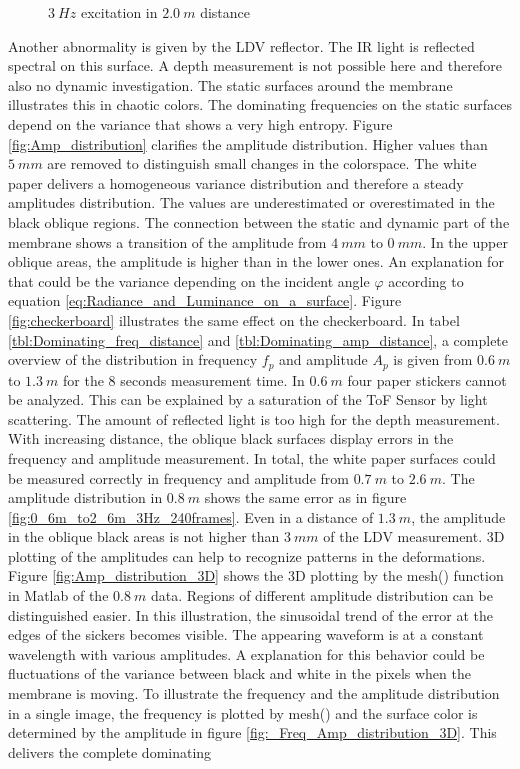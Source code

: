 \begin{figure}[!h]
	\hfill
	\caption{$3~Hz$ excitation in $2.0~m$ distance}
\end{figure}
\newpage
 Another abnormality is given by the LDV reflector. The IR light is reflected spectral on this surface. A depth measurement is not possible here and therefore also no dynamic investigation. The static surfaces around the membrane illustrates this in chaotic colors. The dominating frequencies on the static surfaces depend on the variance that shows a very high entropy. Figure \ref{fig:Amp_distribution} clarifies the amplitude distribution. Higher values than $5~mm$ are removed to distinguish small changes in the colorspace. The white paper delivers a homogeneous variance distribution and therefore a steady amplitudes distribution. The values are underestimated or overestimated in the black oblique regions. The connection between the static and dynamic part of the membrane shows a transition of the amplitude from $4~mm$ to $0~mm$. In the upper oblique areas, the amplitude is higher than in the lower ones. An explanation for that could be the variance depending on the incident angle $\varphi$ according to equation \ref{eq:Radiance_and_Luminance_on_a_surface}. Figure \ref{fig:checkerboard} illustrates the same effect on the checkerboard. In tabel \ref{tbl:Dominating_freq_distance} and \ref{tbl:Dominating_amp_distance}, a complete overview of the distribution in frequency $f_p$ and amplitude $A_p$ is given from $0.6~m$ to $1.3~m$ for the 8 seconds measurement time. In $0.6~m$ four paper stickers cannot be analyzed. This can be explained by a saturation of the ToF Sensor by light scattering. The amount of reflected light is too high for the depth measurement. With increasing distance, the oblique black surfaces display errors in the frequency and amplitude measurement. In total, the white paper surfaces could be measured correctly in frequency and amplitude from $0.7~m$ to $2.6~m$. The amplitude distribution in $0.8~m$ shows the same error as in figure \ref{fig:0_6m_to2_6m_3Hz_240frames}. Even in a distance of $1.3~m$, the amplitude in the oblique black areas is not higher than $3~mm$ of the LDV measurement. 3D plotting of the amplitudes can help to recognize patterns in the deformations. Figure \ref{fig:Amp_distribution_3D} shows the 3D plotting by the mesh() function in Matlab of the $0.8~m$ data. Regions of different amplitude distribution can be distinguished easier. In this illustration, the sinusoidal trend of the error at the edges of the sickers becomes visible. The appearing waveform is at a constant wavelength with various amplitudes. A explanation for this behavior could be fluctuations of the variance between black and white in the pixels when the membrane is moving. To illustrate the frequency and the amplitude distribution in a single image, the frequency is plotted by mesh() and the surface color is determined by the amplitude in figure \ref{fig:_Freq_Amp_distribution_3D}. This delivers the complete dominating 